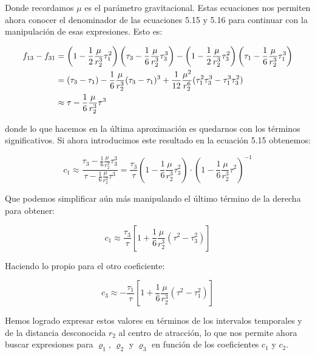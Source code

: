\documentclass{article}
\numberwithin{equation}{section}
\begin{document}
Donde recordamos $\mu$ es el parámetro gravitacional. Estas ecuaciones nos permiten ahora conocer el denominador de las ecuaciones 5.15 y 5.16 para continuar con la manipulación de esas expresiones. Esto es:

\begin{align}
    f_{13} - f_{31} &= \left( 1 - \frac{1}{2} \frac{\mu}{r_2^3} \tau_1^2 \right) 
    \left( \tau_3 - \frac{1}{6} \frac{\mu}{r_2^3} \tau_3^3 \right) - \left( 1 - \frac{1}{2} \frac{\mu}{r_2^3} \tau_3^2 \right) 
    \left( \tau_1 - \frac{1}{6} \frac{\mu}{r_2^3} \tau_1^3 \right) \notag\\
    &= (\tau_3 - \tau_1) - \frac{1}{6} \frac{\mu}{r_2^3} (\tau_3 - \tau_1)^3  + \frac{1}{12} \frac{\mu^2}{r_2^6} (\tau_1^2 \tau_3^3 - \tau_1^3 \tau_3^2) \notag\\
    &\approx \tau - \frac{1}{6} \frac{\mu}{r_2^3} \tau^3
\end{align}

donde lo que hacemos en la última aproximación es quedarnos con los términos significativos. Si ahora introducimos este resultado en la ecuación 5.15 obtenemos:

\begin{equation}
    c_1 \approx \frac{\tau_3 - \frac{1}{6} \frac{\mu}{r_2^3} \tau_3^3}{\tau - \frac{1}{6} \frac{\mu}{r_2^3} \tau^3} 
    = \frac{\tau_3}{\tau} \left( 1 - \frac{1}{6} \frac{\mu}{r_2^3} \tau_3^2 \right) \cdot \left( 1 - \frac{1}{6} \frac{\mu}{r_2^3} \tau^2 \right)^{-1}
\end{equation}

Que podemos simplificar aún más manipulando el último término de la derecha para obtener:

\begin{equation}
c_1 \approx \frac{\tau_3}{\tau} \left[ 1 + \frac{1}{6} \frac{\mu}{r_2^3} (\tau^2 - \tau_3^2) \right]
\end{equation}

Haciendo lo propio para el otro coeficiente:

\begin{equation}
c_3 \approx -\frac{\tau_1}{\tau} \left[ 1 + \frac{1}{6} \frac{\mu}{r_2^3} (\tau^2 - \tau_1^2) \right]
\end{equation}

Hemos logrado expresar estos valores en términos de los intervalos temporales y de la distancia desconocida $r_2$ al centro de atracción, lo que nos permite ahora buscar expresiones para $\varrho_1$, $\varrho_2$ y $\varrho_3$ en función de los coeficientes $c_1$ y $c_2$.\par
\end{document}
